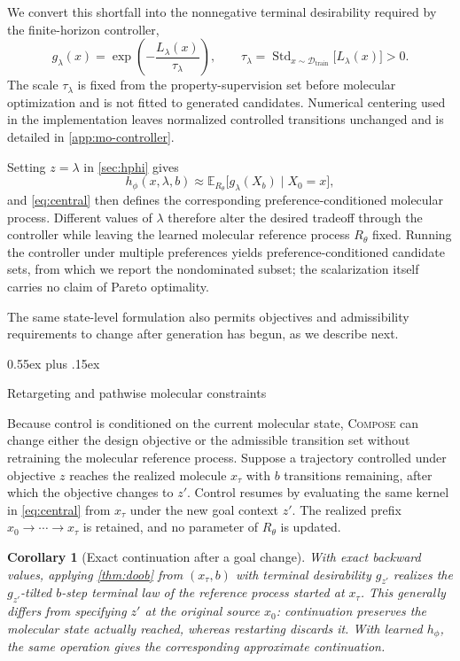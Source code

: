 \documentclass{article}
\makeatletter
\newtheorem{corollary}[theorem]{Corollary}
\theoremstyle{definition}
\theoremstyle{remark}
\newcommand{\method}{\textsc{Compose}\xspace}
\def\subsection{\@startsection{subsection}{2}{\z@}{-1.2ex plus -0.4ex minus -.2ex}%
  {0.55ex plus .15ex}{\normalsize\sc\raggedright}}
\newcommand{\E}{\mathbb{E}}
\makeatother
\begin{document}
We convert this shortfall into the nonnegative terminal desirability required by the finite-horizon controller,
\begin{equation}
g_\lambda(x)=\exp\!\left(-\frac{L_\lambda(x)}{\tau_\lambda}\right),
\qquad
\tau_\lambda=\operatorname{Std}_{x\sim\mathcal D_{\mathrm{train}}}\bigl[L_\lambda(x)\bigr]>0.
\label{eq:glambda}
\end{equation}
The scale $\tau_\lambda$ is fixed from the property-supervision set before molecular optimization and is not fitted to generated candidates. Numerical centering used in the implementation leaves normalized controlled transitions unchanged and is detailed in \cref{app:mo-controller}.

Setting $z=\lambda$ in \cref{sec:hphi} gives
\[
h_\phi(x,\lambda,b)\approx\E_{R_\theta}\bigl[g_\lambda(X_b)\mid X_0=x\bigr],
\]
and \cref{eq:central} then defines the corresponding preference-conditioned molecular process. Different values of $\lambda$ therefore alter the desired tradeoff through the controller while leaving the learned molecular reference process $R_\theta$ fixed. Running the controller under multiple preferences yields preference-conditioned candidate sets, from which we report the nondominated subset; the scalarization itself carries no claim of Pareto optimality.

The same state-level formulation also permits objectives and admissibility requirements to change after generation has begun, as we describe next.

\subsection{Retargeting and pathwise molecular constraints}
\label{sec:retarget}
\label{sec:pathwise-control}

Because control is conditioned on the current molecular state, \method{} can change either the design objective or the admissible transition set without retraining the molecular reference process. Suppose a trajectory controlled under objective $z$ reaches the realized molecule $x_\tau$ with $b$ transitions remaining, after which the objective changes to $z'$. Control resumes by evaluating the same kernel in \cref{eq:central} from $x_\tau$ under the new goal context $z'$. The realized prefix $x_0\rightarrow\cdots\rightarrow x_\tau$ is retained, and no parameter of $R_\theta$ is updated.

\begin{corollary}[Exact continuation after a goal change]
\label{cor:retarget-control}
With exact backward values, applying \cref{thm:doob} from $(x_\tau,b)$ with terminal desirability $g_{z'}$ realizes the $g_{z'}$-tilted $b$-step terminal law of the reference process started at $x_\tau$. This generally differs from specifying $z'$ at the original source $x_0$: continuation preserves the molecular state actually reached, whereas restarting discards it. With learned $h_\phi$, the same operation gives the corresponding approximate continuation.
\end{corollary}
\end{document}

